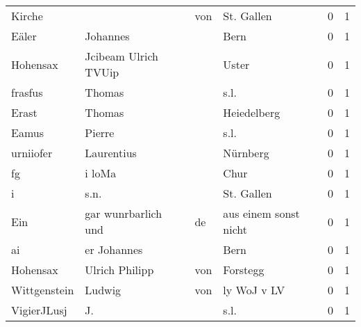 \begin{center}
\begin{tiny}
\begin{longtabu}{llllrr}
                   Kirche &                                    &         von &                                  St. Gallen &          0 &         1 \\
                    Eäler &                           Johannes &             &                                        Bern &          0 &         1 \\
                 Hohensax &               Jcibeam Ulrich TVUip &             &                                       Uster &          0 &         1 \\
                  frasfus &                             Thomas &             &                                        s.l. &          0 &         1 \\
                    Erast &                             Thomas &             &                                 Heiedelberg &          0 &         1 \\
                    Eamus &                             Pierre &             &                                        s.l. &          0 &         1 \\
                urniiofer &                         Laurentius &             &                                    Nürnberg &          0 &         1 \\
                       fg &                             i loMa &             &                                        Chur &          0 &         1 \\
                        i &                               s.n. &             &                                  St. Gallen &          0 &         1 \\
                      Ein &                gar wunrbarlich und &          de &                       aus einem sonst nicht &          0 &         1 \\
                       ai &                        er Johannes &             &                                        Bern &          0 &         1 \\
                 Hohensax &                     Ulrich Philipp &         von &                                    Forstegg &          0 &         1 \\
             Wittgenstein &                             Ludwig &         von &                                 ly WoJ v LV &          0 &         1 \\
              VigierJLusj &                                 J. &             &                                        s.l. &          0 &         1 \\

\end{longtabu}
\end{tiny}
\end{center}
